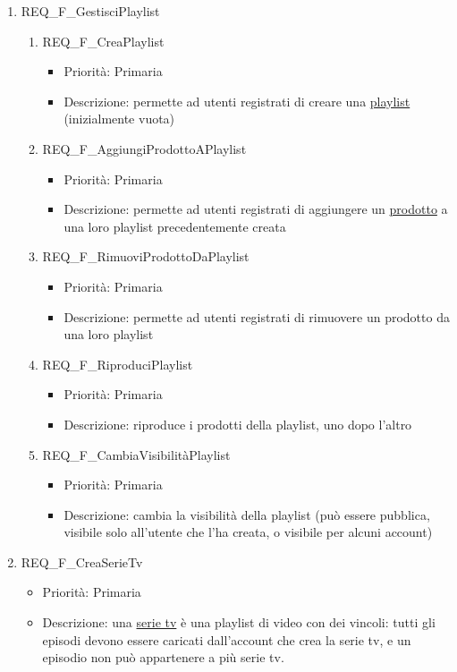 \begin{enumerate}
	\item REQ\_F\_GestisciPlaylist
		\begin{enumerate}[label*=\arabic*.]
		\item REQ\_F\_CreaPlaylist
			\begin{itemize}	
			\item Priorità: Primaria
			\item Descrizione: permette ad utenti registrati di creare una \hyperlink{AnReqPlaylist}{playlist} (inizialmente vuota)
			\end{itemize}
		\item REQ\_F\_AggiungiProdottoAPlaylist
			\begin{itemize}	
			\item Priorità: Primaria
			\item Descrizione: permette ad utenti registrati di aggiungere un \hyperlink{AnReqProdMult}{prodotto} a una loro playlist precedentemente creata
			\end{itemize}

		\item REQ\_F\_RimuoviProdottoDaPlaylist
			\begin{itemize}	
			\item Priorità: Primaria
			\item Descrizione: permette ad utenti registrati di rimuovere un prodotto da una loro playlist
			\end{itemize}

		\item REQ\_F\_RiproduciPlaylist
			\begin{itemize}	
			\item Priorità: Primaria
			\item Descrizione: riproduce i prodotti della playlist, uno dopo l'altro
			\end{itemize}
		
		\item REQ\_F\_CambiaVisibilitàPlaylist
			\begin{itemize}	
			\item Priorità: Primaria
			\item Descrizione: cambia la visibilità della playlist (può essere pubblica, visibile solo all'utente che l'ha creata, o visibile per alcuni account)
			\end{itemize}
		\end{enumerate}		
	
	\item REQ\_F\_CreaSerieTv
		\begin{itemize}	
		\item Priorità: Primaria
		\item Descrizione: una \hyperlink{AnReqSerieTv}{serie tv} è una playlist di video con dei vincoli: tutti gli episodi devono essere caricati dall'account che crea la serie tv, e un episodio non può appartenere a più serie tv.
		\end{itemize}


\end{enumerate}
